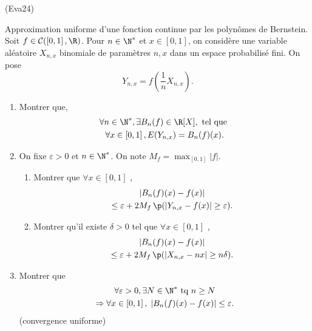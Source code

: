 \begin{tiny}(Eva24)\end{tiny} Approximation uniforme d'une fonction continue par les polynômes de Bernstein.\newline
Soit $f\in \mathcal{C}(\left[ 0,1\right],\R)$. Pour $n\in \N^*$ et $x\in \left[ 0,1\right]$, on considère une variable aléatoire $X_{n,x}$ binomiale de paramètres $n,x$ dans un espace probabilisé fini. On pose
\[
 Y_{n,x} = f(\frac{1}{n}X_{n,x}).
\]
\begin{enumerate}
 \item Montrer que,
\begin{multline*}
\forall n\in \N^*, \exists B_n(f) \in \R[X], \text{ tel que }\\ \forall x \in \left[ 0,1\right] , E(Y_{n,x}) = B_n(f)(x).
\end{multline*}
 \item On fixe $\varepsilon >0$ et $n \in \N^*$. On note $M_f = \max_{\left[ 0,1\right] }|f|$.
\begin{enumerate}
 \item Montrer que $\forall x \in \left[ 0,1\right]$ ,
\begin{multline*}
 \left| B_n(f)(x) -f(x)\right| \\ \leq \varepsilon 
 + 2 M_f\, \p(\left| Y_{n,x} - f(x)\right| \geq \varepsilon).
\end{multline*}
\item Montrer qu'il existe $\delta >0$ tel que $\forall x \in \left[ 0,1\right]$ ,
\begin{multline*}
 \left| B_n(f)(x) -f(x)\right| \\ \leq \varepsilon 
 + 2 M_f\, \p(\left| X_{n,x} - nx\right| \geq n \delta).
\end{multline*}
\end{enumerate}
\item Montrer que
\begin{multline*}
 \forall \varepsilon >0, \exists N \in \N^* \text{ tq }
 n \geq N \\
 \Rightarrow \forall x \in \left[ 0,1 \right] ,\;
 \left|B_{n}(f)(x) - f(x)\right| \leq \varepsilon.
\end{multline*}
(convergence uniforme)
\end{enumerate}

